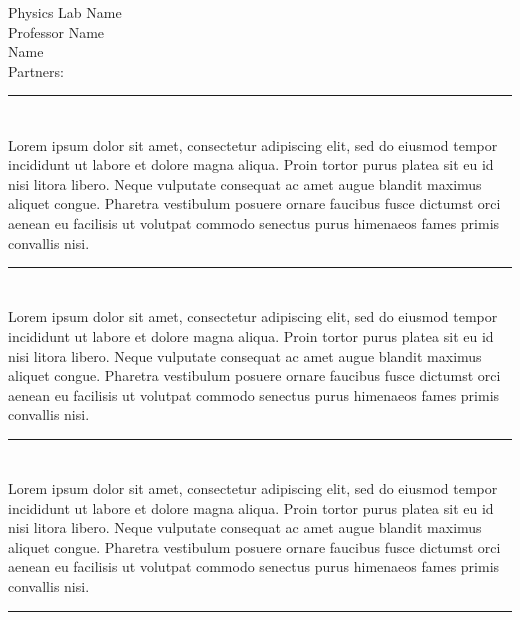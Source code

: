 \documentclass[12pt, letterpaper]{article}
\begin{document}
\begin{center}
    \huge{Physics Lab Name} \\[10pt]
    \large{Professor Name} \\[5pt]
    \large{Name} \\[5pt]
    \large{Partners: }
\end{center}

\rule{\textwidth}{0.5pt}
\section*{}

\noindent Lorem ipsum dolor sit amet, consectetur adipiscing elit, sed do eiusmod tempor incididunt ut labore et dolore magna aliqua. Proin tortor purus platea sit eu id nisi litora libero. Neque vulputate consequat ac amet augue blandit maximus aliquet congue. Pharetra vestibulum posuere ornare faucibus fusce dictumst orci aenean eu facilisis ut volutpat commodo senectus purus himenaeos fames primis convallis nisi.

\rule{\textwidth}{0.5pt}

\section*{}
\noindent Lorem ipsum dolor sit amet, consectetur adipiscing elit, sed do eiusmod tempor incididunt ut labore et dolore magna aliqua. Proin tortor purus platea sit eu id nisi litora libero. Neque vulputate consequat ac amet augue blandit maximus aliquet congue. Pharetra vestibulum posuere ornare faucibus fusce dictumst orci aenean eu facilisis ut volutpat commodo senectus purus himenaeos fames primis convallis nisi.

\rule{\textwidth}{0.5pt}

\section*{}
\noindent Lorem ipsum dolor sit amet, consectetur adipiscing elit, sed do eiusmod tempor incididunt ut labore et dolore magna aliqua. Proin tortor purus platea sit eu id nisi litora libero. Neque vulputate consequat ac amet augue blandit maximus aliquet congue. Pharetra vestibulum posuere ornare faucibus fusce dictumst orci aenean eu facilisis ut volutpat commodo senectus purus himenaeos fames primis convallis nisi.

\rule{\textwidth}{0.5pt}
\end{document}
